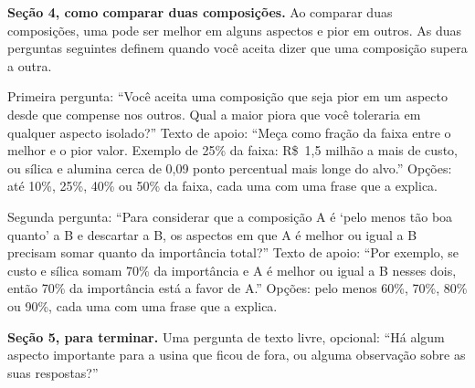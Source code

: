 \documentclass[conference]{IEEEtran}
\begin{document}
\textbf{Seção 4, como comparar duas composições.} Ao comparar duas composições, uma pode ser melhor em alguns aspectos e pior em outros. As duas perguntas seguintes definem quando você aceita dizer que uma composição supera a outra.

Primeira pergunta: ``Você aceita uma composição que seja pior em um aspecto desde que compense nos outros. Qual a maior piora que você toleraria em qualquer aspecto isolado?'' Texto de apoio: ``Meça como fração da faixa entre o melhor e o pior valor. Exemplo de 25\% da faixa: R\$~1,5 milhão a mais de custo, ou sílica e alumina cerca de 0,09 ponto percentual mais longe do alvo.'' Opções: até 10\%, 25\%, 40\% ou 50\% da faixa, cada uma com uma frase que a explica.

Segunda pergunta: ``Para considerar que a composição A é `pelo menos tão boa quanto' a B e descartar a B, os aspectos em que A é melhor ou igual a B precisam somar quanto da importância total?'' Texto de apoio: ``Por exemplo, se custo e sílica somam 70\% da importância e A é melhor ou igual a B nesses dois, então 70\% da importância está a favor de A.'' Opções: pelo menos 60\%, 70\%, 80\% ou 90\%, cada uma com uma frase que a explica.

\textbf{Seção 5, para terminar.} Uma pergunta de texto livre, opcional: ``Há algum aspecto importante para a usina que ficou de fora, ou alguma observação sobre as suas respostas?''

\endgroup
\end{document}
